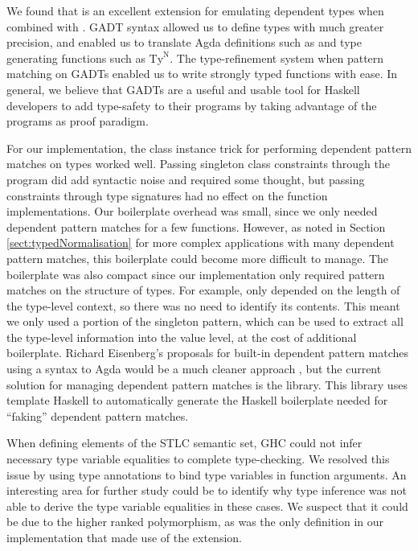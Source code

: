We found that  is an excellent extension for emulating dependent types when combined with . GADT syntax allowed us to define types  with much greater precision, and enabled us to translate Agda  definitions such as  and type generating functions such as $\text{Ty}^\text{N}$. The type-refinement system when pattern matching on GADTs enabled us to write strongly typed functions with ease.
In general, we believe that GADTs are a useful and usable tool for Haskell developers to add type-safety to their programs by taking advantage of the programs as proof paradigm. 

For our implementation, the class instance trick for performing dependent pattern matches on types worked well. Passing singleton class constraints through the program did add syntactic noise and required some thought, but passing constraints through type signatures had no effect on the function implementations. Our boilerplate overhead was small, since we only needed dependent pattern matches for a few functions. However, as noted in Section \ref{sect:typedNormalisation} for more complex applications with many dependent pattern matches, this boilerplate could become more difficult to manage. The boilerplate was also compact since our implementation only required pattern matches on the structure of types. For example,  only depended on the length of the type-level context, so there was no need to identify its contents. This meant we only used a portion of the singleton pattern, which can be used to extract all the type-level information into the value level, at the cost of additional boilerplate.
Richard Eisenberg's proposals for built-in dependent pattern matches using a syntax to Agda would be a much cleaner approach , but the current solution for managing dependent pattern matches is the  library. This library uses template Haskell to automatically generate the Haskell boilerplate needed for “faking” dependent pattern matches.

When defining  elements of the STLC semantic set, GHC could not infer necessary type variable equalities to complete type-checking. We resolved this issue by using type annotations to bind type variables in function arguments. An interesting area for further study could be to identify why type inference was not able to derive the type variable equalities in these cases. We suspect that it could be due to the higher ranked polymorphism, as  was the only definition in our implementation that made use of the  extension.

